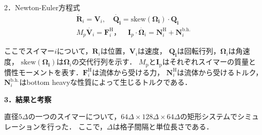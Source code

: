 \documentclass[twocolumns,10pt,a4j]{jarticle}
\begin{document}
  \par
2．Newton-Euler方程式\\
  \vspace{-6truemm}
  \begin{equation}
    \begin{split}
      \dot{\boldsymbol{R}}_i = \boldsymbol{V}_i, \quad \boldsymbol{\dot{Q_i}} = \mathrm{skew} (\boldsymbol{\Omega_i}) \cdot \boldsymbol{Q_i} \\
      M_p \dot{\boldsymbol{V}_i} = \boldsymbol{F}_i^\mathrm{H}， \quad
      \boldsymbol{I}_p \cdot \dot{\boldsymbol{\Omega}_i} = \boldsymbol{N}_i^\mathrm{H} + \boldsymbol{N}_i^\mathrm{b.h.}
    \end{split}
    \label{Newton_Euler}
  \end{equation}
  \vspace{-4truemm}

  \noindent
ここでスイマー$i$について，$\boldsymbol{R}_i$は位置，$\boldsymbol{V}_i$は速度，
$\boldsymbol{Q_i}$は回転行列，$\boldsymbol{\Omega}_i$は角速度，
$\mathrm{skew} (\boldsymbol{\Omega_i})$は$\boldsymbol{\Omega}_i$の交代行列を示す．
$M_\mathrm{p}$と$\boldsymbol{I}_\mathrm{p}$はそれぞれスイマーの質量と慣性モーメントを表す．$\boldsymbol{F}_i^\mathrm{H}$は流体から受ける力，
$\boldsymbol{N}_i^\mathrm{H}$は流体から受けるトルク，$\boldsymbol{N}_i^\mathrm{b.h.}$はbottom heavyな性質によって生じるトルクである．


  \noindent
  {\bf \large 3．結果と考察}
  \par
直径$5\Delta$の一つのスイマーについて，$64\Delta \times 128\Delta \times 64\Delta$の矩形システムでシミュレーションを行った．
ここで，$\Delta$は格子間隔と単位長さである．

\end{document}
